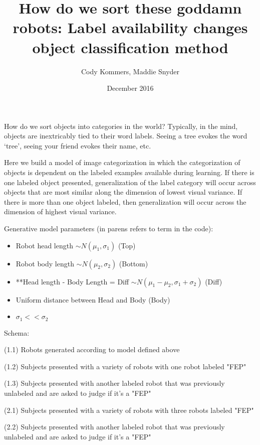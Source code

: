 \documentclass[12pt]{article}
\title{How do we sort these goddamn robots: Label availability changes object classification method}
\author{Cody Kommers, Maddie Snyder}
\date{December 2016}
\begin{document}
\maketitle

\noindent How do we sort objects into categories in the world? Typically, in the mind, objects are inextricably tied to their word labels. Seeing a tree evokes the word `tree', seeing your friend evokes their name, etc. 

\vspace{.2in}

\noindent Here we build a model of image categorization in which the categorization of objects is dependent on the labeled examples available during learning. If there is one labeled object presented, generalization of the label category will occur across objects that are most similar along the dimension of lowest visual variance. If there is more than one object labeled, then generalization will occur across the dimension of highest visual variance. 

\vspace{.2in}

\noindent Generative model parameters (in parens refers to term in the code):
\begin{itemize}
	\item Robot head length $\sim N(\mu_1, \sigma_1)$ (Top)
	\item Robot body length $\sim N(\mu_2, \sigma_2)$ (Bottom)
	\item **Head length - Body Length = Diff $\sim N(\mu_1 - \mu_2, \sigma_1 + \sigma_2)$ (Diff)
	\item Uniform distance between Head and Body (Body)
	\item $\sigma_1 << \sigma_2$
\end{itemize}

\noindent Schema: 

\noindent (1.1) Robots generated according to model defined above

\noindent (1.2) Subjects presented with a variety of robots with one robot labeled "FEP"

\noindent (1.3) Subjects presented with another labeled robot that was previously unlabeled and are asked to judge if it's a "FEP"

\noindent (2.1) Subjects presented with a variety of robots with three robots labeled "FEP"

\noindent (2.2) Subjects presented with another labeled robot that was previously unlabeled and are asked to judge if it's a "FEP"
\end{document}

